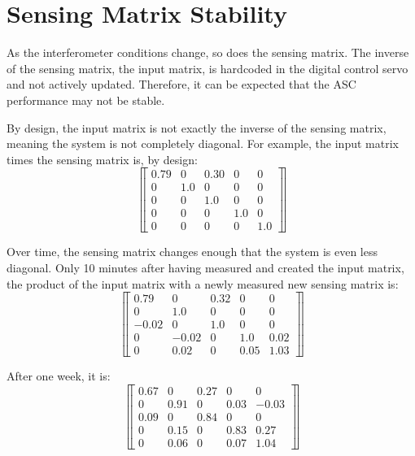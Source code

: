 \section{Sensing Matrix Stability}

As the interferometer conditions change, so does the sensing
matrix. The inverse of the sensing matrix, the input matrix, is
hardcoded in the digital control servo and not actively
updated. Therefore, it can be expected that the ASC performance may
not be stable. 

By design, the input matrix is not exactly the inverse of the sensing
matrix, meaning the system is not completely diagonal. For example,
the input matrix times the sensing matrix is, by design:
 \[ \left\llbracket \begin{array}{ccccc}
0.79 & 0 & 0.30 & 0 & 0 \\
0 & 1.0 & 0 & 0 & 0 \\
0 & 0 & 1.0 & 0 & 0 \\
0 & 0 & 0 & 1.0 & 0 \\
0 & 0 & 0 & 0 & 1.0 
\end{array} \right\rrbracket\] 

Over time, the sensing matrix changes enough that the system is even less 
diagonal. Only 10 minutes after having measured and created the input
matrix, the product of the input matrix with a newly measured new
sensing matrix is: 
\[ \left\llbracket \begin{array}{ccccc}
0.79 & 0 & 0.32 & 0 & 0 \\
0 & 1.0 & 0 & 0 & 0 \\
-0.02 & 0 & 1.0 & 0 & 0 \\
0 & -0.02 & 0 & 1.0 & 0.02 \\
0 & 0.02 & 0 & 0.05 & 1.03 
\end{array} \right\rrbracket\] 

After one week, it is:
 \[ \left\llbracket \begin{array}{ccccc}
0.67 & 0 & 0.27 & 0 & 0 \\
0 & 0.91 & 0 & 0.03 & -0.03 \\
0.09 & 0 & 0.84 & 0 & 0 \\
0 & 0.15 & 0 & 0.83 & 0.27 \\
0 & 0.06 & 0 & 0.07 & 1.04 
\end{array} \right\rrbracket\] 

